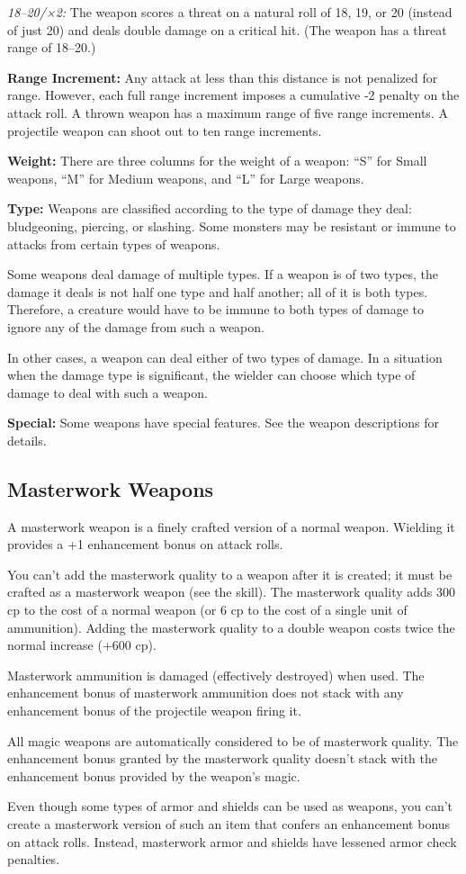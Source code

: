 \textit{18--20/×2:} The weapon scores a threat on a natural roll of 18, 19, or 20 (instead of just 20) and deals double damage on a critical hit. (The weapon has a threat range of 18--20.)

\textbf{Range Increment:} Any attack at less than this distance is not penalized for range. However, each full range increment imposes a cumulative -2 penalty on the attack roll. A thrown weapon has a maximum range of five range increments. A projectile weapon can shoot out to ten range increments.

\textbf{Weight:} There are three columns for the weight of a weapon: ``S'' for Small weapons, ``M'' for Medium weapons, and ``L'' for Large weapons.

\textbf{Type:} Weapons are classified according to the type of damage they deal: bludgeoning, piercing, or slashing. Some monsters may be resistant or immune to attacks from certain types of weapons.

Some weapons deal damage of multiple types. If a weapon is of two types, the damage it deals is not half one type and half another; all of it is both types. Therefore, a creature would have to be immune to both types of damage to ignore any of the damage from such a weapon.

In other cases, a weapon can deal either of two types of damage. In a situation when the damage type is significant, the wielder can choose which type of damage to deal with such a weapon.

\textbf{Special:} Some weapons have special features. See the weapon descriptions for details.



\subsection{Masterwork Weapons}
A masterwork weapon is a finely crafted version of a normal weapon. Wielding it provides a +1 enhancement bonus on attack rolls.

You can't add the masterwork quality to a weapon after it is created; it must be crafted as a masterwork weapon (see the  skill). The masterwork quality adds 300 cp to the cost of a normal weapon (or 6 cp to the cost of a single unit of ammunition). Adding the masterwork quality to a double weapon costs twice the normal increase (+600 cp).

Masterwork ammunition is damaged (effectively destroyed) when used. The enhancement bonus of masterwork ammunition does not stack with any enhancement bonus of the projectile weapon firing it.

All magic weapons are automatically considered to be of masterwork quality. The enhancement bonus granted by the masterwork quality doesn't stack with the enhancement bonus provided by the weapon's magic.

Even though some types of armor and shields can be used as weapons, you can't create a masterwork version of such an item that confers an enhancement bonus on attack rolls. Instead, masterwork armor and shields have lessened armor check penalties.
